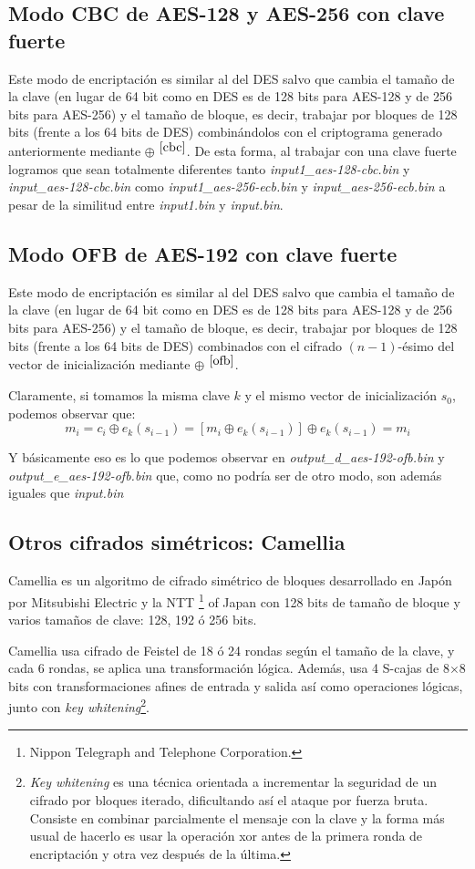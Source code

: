 \documentclass[a4paper, 11pt]{article}
\begin{document}
	\subsection{Modo CBC de AES-128 y AES-256 con clave fuerte}
		Este modo de encriptación es similar al del DES salvo que cambia el tamaño de la clave (en lugar de 64 bit como en
		DES es de 128 bits para AES-128 y de 256 bits para AES-256) y el tamaño de bloque, es decir, trabajar por bloques
		de 128 bits (frente a los 64 bits de DES) combinándolos con el criptograma generado anteriormente mediante $\oplus$
		$^{\ref{cbc}}$. De esta forma, al trabajar con una clave fuerte logramos que sean totalmente diferentes tanto
		\textit{input1\_aes-128-cbc.bin} y \textit{input\_aes-128-cbc.bin} como \textit{input1\_aes-256-ecb.bin} y
		\textit{input\_aes-256-ecb.bin} a pesar de la similitud entre \textit{input1.bin} y \textit{input.bin}.
		
	\subsection{Modo OFB de AES-192 con clave fuerte}
		Este modo de encriptación es similar al del DES salvo que cambia el tamaño de la clave (en lugar de 64 bit como en
		DES es de 128 bits para AES-128 y de 256 bits para AES-256) y el tamaño de bloque, es decir, trabajar por bloques
		de 128 bits (frente a los 64 bits de DES) combinados con el cifrado $(n-1)$-ésimo del vector de inicialización
		mediante $\oplus$ $^{\ref{ofb}}$.
		
		Claramente, si tomamos la misma clave $k$ y el mismo vector de inicialización $s_0$, podemos observar que:
		\[m_i = c_i \oplus e_k(s_{i-1}) = [m_i \oplus e_k(s_{i-1})] \oplus e_k(s_{i-1}) = m_i\]
		
		Y básicamente eso es lo que podemos observar en \textit{output\_d\_aes-192-ofb.bin} y \textit{output\_e\_aes-192-ofb.bin}
		que, como no podría ser de otro modo, son además iguales que \textit{input.bin}
		
	\subsection{Otros cifrados simétricos: Camellia}
		Camellia es un algoritmo de cifrado simétrico de bloques desarrollado en Japón por Mitsubishi Electric y la NTT
		\footnote{Nippon Telegraph and Telephone Corporation.} of Japan con 128 bits de tamaño de bloque y varios tamaños de
		clave: 128, 192 ó 256 bits.
		
		Camellia usa cifrado de Feistel de 18 ó 24 rondas según el tamaño de la clave, y cada 6 rondas, se aplica una
		transformación lógica. Además, usa 4 S-cajas de 8$\times$8 bits con transformaciones afines de entrada y salida así
		como operaciones lógicas, junto con \textit{key whitening}\footnote{\textit{Key whitening} es una técnica orientada
		a incrementar la seguridad de un cifrado por bloques iterado, dificultando así el ataque por fuerza bruta. Consiste
		en combinar parcialmente el mensaje con la clave y la forma más usual de hacerlo es usar la operación xor antes de
		la primera ronda de encriptación y otra vez después de la última.}.
\end{document}
